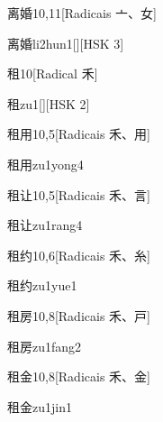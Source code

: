 \begin{entry}{离婚}{10,11}[Radicais ⼇、⼥]
  \begin{phonetics}{离婚}{li2hun1}[][HSK 3]
  \end{phonetics}
\end{entry}

\begin{entry}{租}{10}[Radical ⽲]
  \begin{phonetics}{租}{zu1}[][HSK 2]
  \end{phonetics}
\end{entry}

\begin{entry}{租用}{10,5}[Radicais ⽲、⽤]
  \begin{phonetics}{租用}{zu1yong4}
  \end{phonetics}
\end{entry}

\begin{entry}{租让}{10,5}[Radicais ⽲、⾔]
  \begin{phonetics}{租让}{zu1rang4}
  \end{phonetics}
\end{entry}

\begin{entry}{租约}{10,6}[Radicais ⽲、⽷]
  \begin{phonetics}{租约}{zu1yue1}
  \end{phonetics}
\end{entry}

\begin{entry}{租房}{10,8}[Radicais ⽲、⼾]
  \begin{phonetics}{租房}{zu1fang2}
  \end{phonetics}
\end{entry}

\begin{entry}{租金}{10,8}[Radicais ⽲、⾦]
  \begin{phonetics}{租金}{zu1jin1}
  \end{phonetics}
\end{entry}

